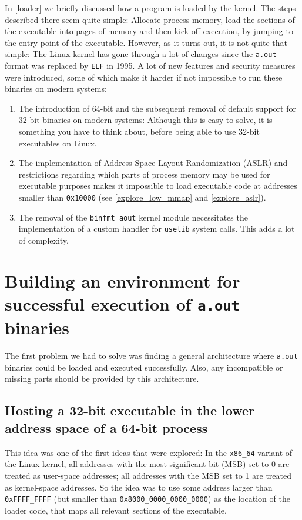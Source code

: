 \documentclass[draft,final]{vutinfth} %
\begin{document}
In \ref{loader} we briefly discussed how a program is loaded by the kernel. The steps described there seem quite simple: Allocate process memory, load the sections of the executable into pages of memory and then kick off execution, by jumping to the entry-point of the executable. However, as it turns out, it is not quite that simple: The Linux kernel has gone through a lot of changes since the \texttt{a.out} format was replaced by \texttt{ELF} in 1995. A lot of new features and security measures were introduced, some of which make it harder if not impossible to run these binaries on modern systems:

\begin{enumerate}
    \item The introduction of 64-bit and the subsequent removal of default support for 32-bit binaries on modern systems: Although this is easy to solve, it is something you have to think about, before being able to use 32-bit executables on Linux.
    \item The implementation of Address Space Layout Randomization (ASLR) and restrictions regarding which parts of process memory may be used for executable purposes makes it impossible to load executable code at addresses smaller than \texttt{0x10000} (see \ref{explore_low_mmap} and \ref{explore_aslr}).
    \item The removal of the \texttt{binfmt\_aout} kernel module necessitates the implementation of a custom handler for \texttt{uselib} system calls. This adds a lot of complexity.
\end{enumerate}

\section{Building an environment for successful execution of \texttt{a.out} binaries}
\label{explore_environment}

The first problem we had to solve was finding a general architecture where \texttt{a.out} binaries could be loaded and executed successfully. Also, any incompatible or missing parts should be provided by this architecture.

\subsection{Hosting a 32-bit executable in the lower address space of a 64-bit process}
\label{explore_32_64_SxS}

This idea was one of the first ideas that were explored: In the \texttt{x86\_64} variant of the Linux kernel, all addresses with the most-significant bit (MSB) set to 0 are treated as user-space addresses; all addresses with the MSB set to 1 are treated as kernel-space addresses. So the idea was to use some address larger than \texttt{0xFFFF\_FFFF} (but smaller than \texttt{0x8000\_0000\_0000\_0000}) as the location of the loader code, that maps all relevant sections of the executable.
\end{document}
